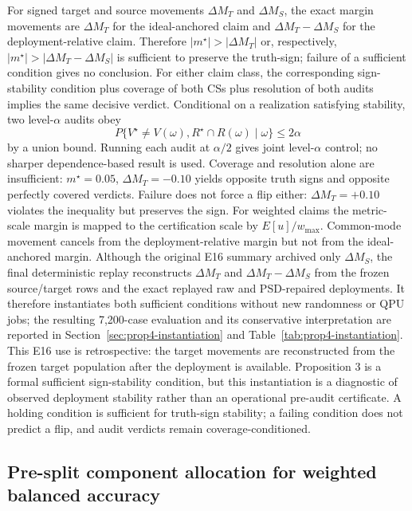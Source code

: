 \documentclass[11pt,a4paper]{article}
\begin{document}
For signed target and source movements $\Delta M_T$ and $\Delta M_S$, the
exact margin movements are $\Delta M_T$ for the ideal-anchored claim and
$\Delta M_T-\Delta M_S$ for the deployment-relative claim. Therefore
$|m^\star|>|\Delta M_T|$ or, respectively,
$|m^\star|>|\Delta M_T-\Delta M_S|$ is sufficient to preserve the truth-sign;
failure of a sufficient condition gives no conclusion. For either claim
class, the corresponding sign-stability condition plus coverage of both CSs
plus resolution of both audits implies the same decisive verdict. Conditional
on a realization satisfying stability, two level-$\alpha$ audits obey
\[
 P\{V^\star\ne V(\omega),R^\star\cap R(\omega)\mid\omega\}\leq2\alpha
\]
by a union bound. Running each audit at $\alpha/2$ gives joint level-$\alpha$
control; no sharper dependence-based result is used. Coverage and resolution
alone are insufficient: $m^\star=0.05$, $\Delta M_T=-0.10$ yields opposite
truth signs and opposite perfectly covered verdicts. Failure does not force a
flip either: $\Delta M_T=+0.10$ violates the inequality but preserves the sign.
For weighted claims the
metric-scale margin is mapped to the certification scale by
$E[u]/w_{\max}$. Common-mode movement cancels from the
deployment-relative margin but not from the ideal-anchored margin.
Although the original E16 summary archived only $\Delta M_S$, the final
deterministic replay reconstructs $\Delta M_T$ and
$\Delta M_T-\Delta M_S$ from the frozen source/target rows and the exact
replayed raw and PSD-repaired deployments. It therefore instantiates both
sufficient conditions without new randomness or QPU jobs; the resulting
7,200-case evaluation and its conservative interpretation are reported in
Section~\ref{sec:prop4-instantiation} and
Table~\ref{tab:prop4-instantiation}.
This E16 use is retrospective: the target movements are reconstructed from the
frozen target population after the deployment is available. Proposition 3 is
a formal sufficient sign-stability condition, but this instantiation is a
diagnostic of observed deployment stability rather than an operational
pre-audit certificate. A holding condition is sufficient for truth-sign
stability; a failing condition does not predict a flip, and audit verdicts
remain coverage-conditioned.

\subsection{Pre-split component allocation for weighted balanced accuracy}
\end{document}
